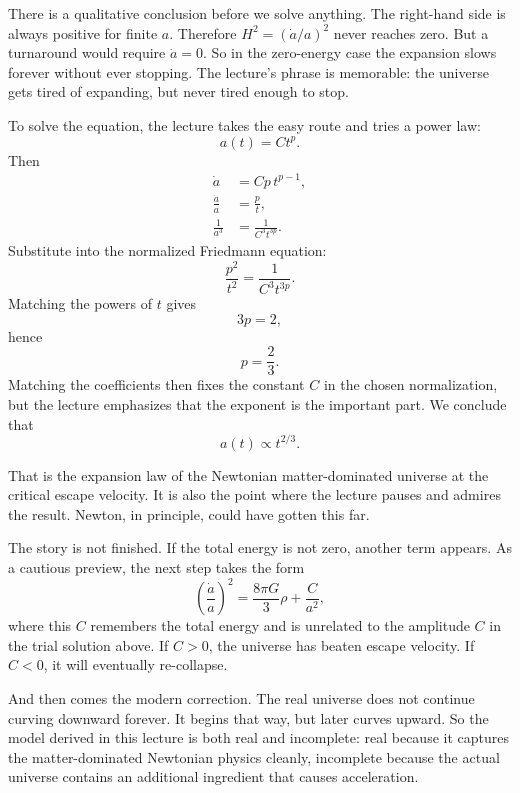 There is a qualitative conclusion before we solve anything. The right-hand side is always positive for finite \(a\). Therefore \(H^2=(\dot a/a)^2\) never reaches zero. But a turnaround would require \(\dot a=0\). So in the zero-energy case the expansion slows forever without ever stopping. The lecture's phrase is memorable: the universe gets tired of expanding, but never tired enough to stop.

To solve the equation, the lecture takes the easy route and tries a power law:
\begin{equation}
a(t)=Ct^p.
\end{equation}
Then
\begin{align}
\dot a&=Cp\,t^{p-1},\\
\frac{\dot a}{a}&=\frac{p}{t},\\
\frac{1}{a^3}&=\frac{1}{C^3 t^{3p}}.
\end{align}
Substitute into the normalized Friedmann equation:
\begin{equation}
\frac{p^2}{t^2}=\frac{1}{C^3 t^{3p}}.
\end{equation}
Matching the powers of \(t\) gives
\begin{equation}
3p=2,
\end{equation}
hence
\begin{equation}
p=\frac23.
\end{equation}
Matching the coefficients then fixes the constant \(C\) in the chosen normalization, but the lecture emphasizes that the exponent is the important part. We conclude that
\begin{equation}
a(t)\propto t^{2/3}.
\end{equation}

That is the expansion law of the Newtonian matter-dominated universe at the critical escape velocity. It is also the point where the lecture pauses and admires the result. Newton, in principle, could have gotten this far.

The story is not finished. If the total energy is not zero, another term appears. As a cautious preview, the next step takes the form
\begin{equation}
\left(\frac{\dot a}{a}\right)^2=\frac{8\pi G}{3}\rho+\frac{C}{a^2},
\end{equation}
where this \(C\) remembers the total energy and is unrelated to the amplitude \(C\) in the trial solution above. If \(C>0\), the universe has beaten escape velocity. If \(C<0\), it will eventually re-collapse.

And then comes the modern correction. The real universe does not continue curving downward forever. It begins that way, but later curves upward. So the model derived in this lecture is both real and incomplete: real because it captures the matter-dominated Newtonian physics cleanly, incomplete because the actual universe contains an additional ingredient that causes acceleration.


